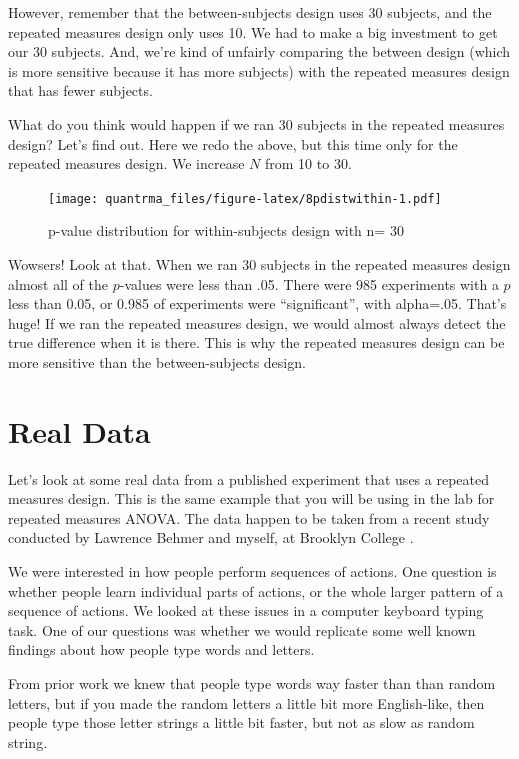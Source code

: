 \documentclass[
]{book}
\begin{document}
However, remember that the between-subjects design uses 30 subjects, and the repeated measures design only uses 10. We had to make a big investment to get our 30 subjects. And, we're kind of unfairly comparing the between design (which is more sensitive because it has more subjects) with the repeated measures design that has fewer subjects.

What do you think would happen if we ran 30 subjects in the repeated measures design? Let's find out. Here we redo the above, but this time only for the repeated measures design. We increase \(N\) from 10 to 30.

\begin{figure}
\centering
\texttt{[image: quantrma\_files/figure-latex/8pdistwithin-1.pdf]}
\caption{\label{fig:8pdistwithin}p-value distribution for within-subjects design with n= 30}
\end{figure}

Wowsers! Look at that. When we ran 30 subjects in the repeated measures design almost all of the \(p\)-values were less than .05. There were 985 experiments with a \(p\) less than 0.05, or 0.985 of experiments were ``significant'', with alpha=.05. That's huge! If we ran the repeated measures design, we would almost always detect the true difference when it is there. This is why the repeated measures design can be more sensitive than the between-subjects design.

\hypertarget{real-data}{%
\section{Real Data}\label{real-data}}

Let's look at some real data from a published experiment that uses a repeated measures design. This is the same example that you will be using in the lab for repeated measures ANOVA. The data happen to be taken from a recent study conducted by Lawrence Behmer and myself, at Brooklyn College \citep{behmer2017spatial}.

We were interested in how people perform sequences of actions. One question is whether people learn individual parts of actions, or the whole larger pattern of a sequence of actions. We looked at these issues in a computer keyboard typing task. One of our questions was whether we would replicate some well known findings about how people type words and letters.

From prior work we knew that people type words way faster than than random letters, but if you made the random letters a little bit more English-like, then people type those letter strings a little bit faster, but not as slow as random string.
\end{document}
